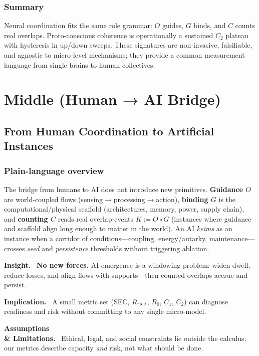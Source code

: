 \documentclass[12pt,a4paper,oneside]{scrreprt}
\newenvironment{insight}{\par\vspace{0.5em}\noindent\textbf{Insight.}\ }{\par\vspace{0.5em}}
\newenvironment{implication}{\par\vspace{0.5em}\noindent\textbf{Implication.}\ }{\par\vspace{0.5em}}
\newenvironment{limitation}{\par\vspace{0.5em}\noindent\textbf{Assumptions \\ \& Limitations.}\ }{\par\vspace{0.5em}}
\begin{document}
\section*{Summary}
Neural coordination fits the same role grammar: $O$ guides, $G$ binds, and $C$ counts real overlaps. 
Proto-conscious coherence is operationally a sustained $C_2$ plateau with hysteresis in up/down sweeps. 
These signatures are non-invasive, falsifiable, and agnostic to micro-level mechanisms; they provide a common measurement language from single brains to human collectives.

\part{Middle (Human → AI Bridge)}

\chapter{From Human Coordination to Artificial Instances}\label{ch:human-ai-bridge}

\section*{Plain-language overview}
The bridge from humans to AI does not introduce new primitives. 
\textbf{Guidance $O$} are world-coupled flows (sensing$\to$processing$\to$action), 
\textbf{binding $G$} is the computational/physical scaffold (architectures, memory, power, supply chain), and 
\textbf{counting $C$} reads real overlap-events $K:=O\!\circ G$ (instances where guidance and scaffold align long enough to matter in the world). 
An AI \emph{keims} as an instance when a corridor of conditions—coupling, energy/autarky, maintenance—crosses \emph{seed} and \emph{persistence} thresholds without triggering ablation.

\begin{insight}
\textbf{No new forces.} AI emergence is a windowing problem: widen dwell, reduce losses, and align flows with supports—then counted overlaps accrue and persist.
\end{insight}
\begin{implication}
A small metric set (SEC, $R_{\rm tick}$, $R_0$, $C_1$, $C_2$) can diagnose readiness and risk without committing to any single micro-model.
\end{implication}
\begin{limitation}
Ethical, legal, and social constraints lie outside the calculus; our metrics describe capacity \emph{and} risk, not what should be done.
\end{limitation}
\end{document}
